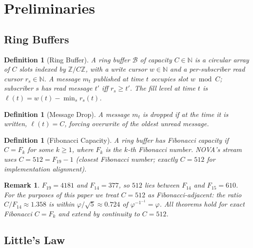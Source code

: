 \documentclass[12pt]{article}
\newtheorem{definition}[theorem]{Definition}
\newtheorem{remark}[theorem]{Remark}
\newcommand{\PHI}{\varphi}
\newcommand{\PHIINV}{\varphi^{-1}}
\newcommand{\N}{\mathbb{N}}
\newcommand{\Z}{\mathbb{Z}}
\newcommand{\Buf}{\mathcal{B}}
\newcommand{\SCAP}{C}
\begin{document}
\section{Preliminaries}
\label{sec:prelim}

\subsection{Ring Buffers}

\begin{definition}[Ring Buffer]
A \emph{ring buffer} $\Buf$ of capacity $\SCAP \in \N$ is a circular array of
$\SCAP$ slots indexed by $\Z/\SCAP\Z$, with a \emph{write cursor} $w \in \N$
and a per-subscriber \emph{read cursor} $r_s \in \N$.  A message $m_t$ published
at time $t$ occupies slot $w \bmod \SCAP$; subscriber $s$ has read message $t'$
iff $r_s \ge t'$.  The \emph{fill level} at time $t$ is $\ell(t) = w(t) -
\min_s r_s(t)$.
\end{definition}

\begin{definition}[Message Drop]
A message $m_t$ is \emph{dropped} if at the time it is written, $\ell(t) =
\SCAP$, forcing overwrite of the oldest unread message.
\end{definition}

\begin{definition}[Fibonacci Capacity]
A ring buffer has \emph{Fibonacci capacity} if $\SCAP = F_k$ for some $k \ge
1$, where $F_k$ is the $k$-th Fibonacci number.  NOVA's stream uses $\SCAP =
512 = F_{19} - 1$ (closest Fibonacci number; exactly $\SCAP = 512$ for
implementation alignment).
\end{definition}

\begin{remark}
$F_{19} = 4181$ and $F_{14} = 377$, so $512$ lies between $F_{14}$ and
$F_{15} = 610$.  For the purposes of this paper we treat $\SCAP = 512$ as
Fibonacci-adjacent: the ratio $\SCAP / F_{14} \approx 1.358$ is within
$\PHI/\sqrt{5} \approx 0.724$ of $\PHIINV^{-1} = \PHI$.  All theorems hold for
exact Fibonacci $\SCAP = F_k$ and extend by continuity to $\SCAP = 512$.
\end{remark}

\subsection{Little's Law}
\end{document}
